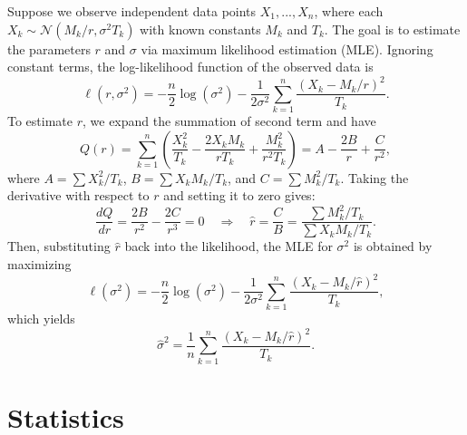 \documentclass[mnsc]{informs3}
\begin{document}
\begin{APPENDICES}
Suppose we observe independent data points \( X_1, ..., X_n \), where each \( X_k \sim \mathcal{N}(M_k / r, \sigma^2 T_k) \) with known constants \( M_k \) and \( T_k \). 
The goal is to estimate the parameters \( r \) and \( \sigma \) via maximum likelihood estimation (MLE).
Ignoring constant terms, the log-likelihood function of the observed data is
\[
\ell(r, \sigma^2) = - \frac{n}{2} \log(\sigma^2) - \frac{1}{2\sigma^2} \sum_{k=1}^n \frac{\left( X_k - M_k/r \right)^2}{T_k}.
\]
To estimate $r$, we expand the summation of second term and have 
\[
Q(r) = \sum_{k=1}^n \left( \frac{X_k^2}{T_k} - \frac{2X_k M_k}{r T_k} + \frac{M_k^2}{r^2 T_k} \right)
= A - \frac{2B}{r} + \frac{C}{r^2},
\]
where \( A = \sum X_k^2/T_k \), \( B = \sum X_k M_k/T_k \), and \( C = \sum M_k^2/T_k \). Taking the derivative with respect to \( r \) and setting it to zero gives:
\begin{equation*}
\frac{dQ}{dr} = \frac{2B}{r^2} - \frac{2C}{r^3} = 0 \quad \Rightarrow \quad \hat{r} = \frac{C}{B} = \frac{\sum M_k^2/T_k}{\sum X_k M_k/T_k}.
\end{equation*}
Then, substituting \( \hat{r} \) back into the likelihood, the MLE for \( \sigma^2 \) is obtained by maximizing
\[
\ell(\sigma^2) = -\frac{n}{2} \log(\sigma^2) - \frac{1}{2\sigma^2} \sum_{k=1}^n \frac{\left( X_k - M_k/\hat{r} \right)^2}{T_k},
\]
which yields
\begin{equation}\label{normal-mle-sigma}
\hat{\sigma}^2 = \frac{1}{n} \sum_{k=1}^n \frac{\left( X_k - M_k/\hat{r}\right)^2}{T_k}.
\end{equation}








\section{Statistics}\label{appendix-statistics}


\end{APPENDICES}
\end{document}
